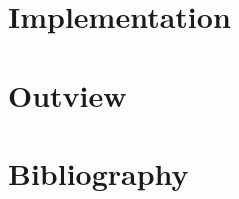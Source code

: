 \documentclass[10pt,a4paper]{article}
\begin{document}
\section{Implementation}
\section{Outview}
\section{Bibliography}
\end{document}
